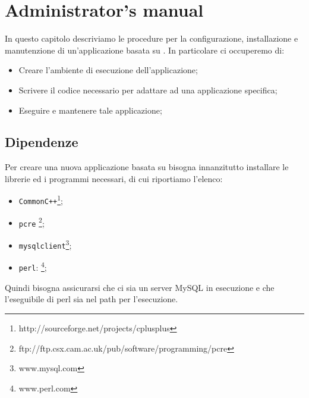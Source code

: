 % 
% 
% 
% 
% 
\chapter{Administrator's manual}
In questo capitolo descriviamo le procedure per la configurazione,
installazione e manutenzione di un'applicazione basata su
\mcs. In particolare ci occuperemo di:
\begin{itemize}
\item Creare l'ambiente di esecuzione dell'applicazione;
\item Scrivere il codice necessario per adattare \mcs ad una
  applicazione specifica;
\item Eseguire e mantenere tale applicazione;
\end{itemize}


\section{Dipendenze}\label{sec:dipendenze}
Per creare una nuova applicazione basata su \mcs bisogna
innanzitutto installare le librerie ed i programmi necessari, di cui
riportiamo l'elenco:
\begin{itemize}
\item
  \verb|CommonC++|\footnote{http://sourceforge.net/projects/cplusplus};
\item \verb|pcre|
  \footnote{ftp://ftp.csx.cam.ac.uk/pub/software/programming/pcre};
\item \verb|mysqlclient|\footnote{www.mysql.com};
\item \verb|perl|: \footnote{www.perl.com};
\end{itemize}
%
Quindi bisogna assicurarsi che ci sia un server MySQL in esecuzione e
che l'eseguibile di perl sia nel path per l'esecuzione.

